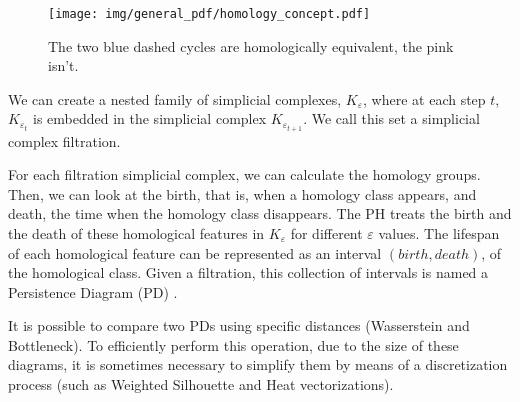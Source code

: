 \documentclass{article}
\begin{document}
\begin{wrapfigure}{L}{0.5\textwidth}
\centering
    \texttt{[image: img/general\_pdf/homology\_concept.pdf]}
    \caption{The two blue dashed cycles are homologically equivalent, the pink isn't.} 
    \label{fig:homology_concept}
\end{wrapfigure} %



We can create a nested family of simplicial complexes, $K_\varepsilon$, where at each step $t$, $K_{\varepsilon_t}$ is embedded in the simplicial complex $K_{\varepsilon_{t+1}}$. We call this set a simplicial complex filtration. 

For each filtration simplicial complex, we can calculate the homology groups. Then, we can look at the birth, that is, when a homology class appears, and death, the time when the homology class disappears. The PH treats the birth and the death of these homological features in $K_\varepsilon$ for different $\varepsilon$ values. The lifespan of each homological feature can be represented as an interval $(birth, death)$, of the homological class. Given a filtration, this collection of intervals is named a Persistence Diagram (PD) \cite{Carlsson2009TopologyAD}.

It is possible to compare two PDs using specific distances (Wasserstein and Bottleneck). To efficiently perform this operation, due to the size of these diagrams, it is sometimes necessary to simplify them by means of a discretization process (such as Weighted Silhouette and Heat vectorizations).%
\end{document}
